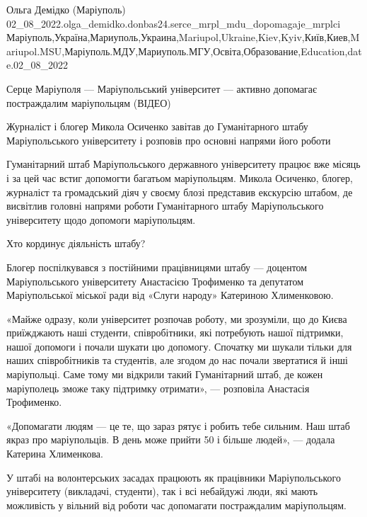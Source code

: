  
 
 
 
 

Ольга Демідко (Маріуполь)
02_08_2022.olga_demidko.donbas24.serce_mrpl_mdu_dopomagaje_mrplci
Маріуполь,Україна,Мариуполь,Украина,Mariupol,Ukraine,Kiev,Kyiv,Київ,Киев,Mariupol.MSU,Маріуполь.МДУ,Мариуполь.МГУ,Освіта,Образование,Education,date.02_08_2022

Серце Маріуполя — Маріупольський університет — активно допомагає постраждалим маріупольцям (ВІДЕО)

Журналіст і блогер Микола Осиченко завітав до Гуманітарного штабу
Маріупольського університету і розповів про основні напрями його роботи

Гуманітарний штаб Маріупольського державного університету працює вже місяць і
за цей час встиг допомогти багатьом маріупольцям. Микола Осиченко, блогер,
журналіст та громадський діяч у своєму блозі представив екскурсію штабом, де
висвітлив головні напрями роботи Гуманітарного штабу Маріупольського
університету щодо допомоги маріупольцям.

Хто кординує діяльність штабу?

Блогер поспілкувався з постійними працівницями штабу — доцентом Маріупольського
університету Анастасією Трофименко та депутатом Маріупольської міської ради від
«Слуги народу» Катериною Хлименковою.

«Майже одразу, коли університет розпочав роботу, ми зрозуміли, що до Києва
приїжджають наші студенти, співробітники, які потребують нашої підтримки, нашої
допомоги і почали шукати цю допомогу. Спочатку ми шукали тільки для наших
співробітників та студентів, але згодом до нас почали звертатися й інші
маріупольці. Саме тому ми відкрили такий Гуманітарний штаб, де кожен
маріуполець зможе таку підтримку отримати», — розповіла Анастасія Трофименко.

«Допомагати людям — це те, що зараз рятує і робить тебе сильним. Наш штаб якраз
про маріупольців. В день може прийти 50 і більше людей», — додала Катерина
Хлименкова.

У штабі на волонтерських засадах працюють як працівники Маріупольського
університету (викладачі, студенти), так і всі небайдужі люди, які мають
можливість у вільний від роботи час допомагати постраждалим маріупольцям.

